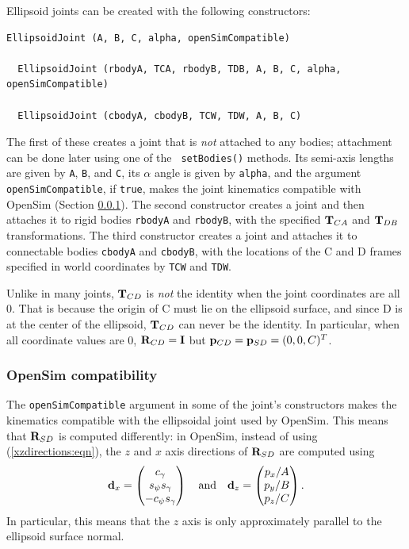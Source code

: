 Ellipsoid joints can be created with the following constructors:
%
\begin{lstlisting}[]
  EllipsoidJoint (A, B, C, alpha, openSimCompatible)

  EllipsoidJoint (rbodyA, TCA, rbodyB, TDB, A, B, C, alpha, openSimCompatible)

  EllipsoidJoint (cbodyA, cbodyB, TCW, TDW, A, B, C)
\end{lstlisting}
%
The first of these creates a joint that is {\it not} attached to any
bodies; attachment can be done later using one of the {\tt
setBodies()} methods.  Its semi-axis lengths are given by {\tt A},
{\tt B}, and {\tt C}, its $\alpha$ angle is given by {\tt alpha}, and
the argument {\tt openSimCompatible}, if {\tt true}, makes the joint
kinematics compatible with OpenSim (Section \ref{OpenSimCompat:sec}).
The second constructor creates a joint and then attaches it to rigid
bodies {\tt rbodyA} and {\tt rbodyB}, with the specified ${\bf T}_{CA}$ and
${\bf T}_{DB}$ transformations. The third constructor creates a joint and
attaches it to connectable bodies {\tt cbodyA} and {\tt cbodyB}, with
the locations of the C and D frames specified in world coordinates by
{\tt TCW} and {\tt TDW}.

\begin{sideblock}
Unlike in many joints, ${\bf T}_{CD}$ is {\it not} the identity when the
joint coordinates are all $0$. That is because the origin of C must
lie on the ellipsoid surface, and since D is at the center of the
ellipsoid, ${\bf T}_{CD}$ can never be the identity. In particular,
when all coordinate values are 0, ${\bf R}_{CD} = {\bf I}$ but
${\bf p}_{CD} = {\bf p}_{SD} = (0, 0, C)^T$.
\end{sideblock}

\subsubsection{OpenSim compatibility}
\label{OpenSimCompat:sec}

The {\tt openSimCompatible} argument in some of the joint's
constructors makes the kinematics compatible with the ellipsoidal
joint used by OpenSim. This means that ${\bf R}_{SD}$ is computed
differently: in OpenSim, instead of
using (\ref{xzdirections:eqn}), the $z$ and $x$ axis directions of
${\bf R}_{SD}$ are computed using
%
\begin{equation}
{\bf d}_x = \left(\begin{matrix} c_\gamma \\ s_\psi s_\gamma \\ -c_\psi s_\gamma \end{matrix}\right)
\quad \text{and} \quad
{\bf d}_z = \left(\begin{matrix} p_x/A \\ p_y/B \\ p_z/C \end{matrix}\right).
\end{equation}
%
In particular, this means that the $z$ axis is only approximately
parallel to the ellipsoid surface normal.

